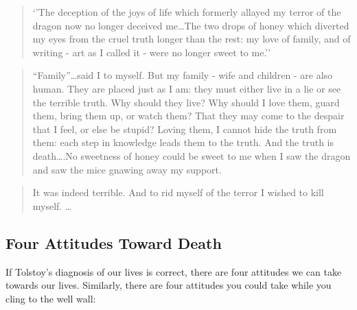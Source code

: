 \documentclass[]{article}
\begin{document}
\begin{quote}
`'The deception of the joys of life which formerly allayed my terror of
the dragon now no longer deceived me\ldots{}The two drops of honey which
diverted my eyes from the cruel truth longer than the rest: my love of
family, and of writing - art as I called it - were no longer sweet to
me.''
\end{quote}

\begin{quote}
``Family''\ldots{}said I to myself. But my family - wife and children -
are also human. They are placed just as I am: they must either live in a
lie or see the terrible truth. Why should they live? Why should I love
them, guard them, bring them up, or watch them? That they may come to
the despair that I feel, or else be stupid? Loving them, I cannot hide
the truth from them: each step in knowledge leads them to the truth. And
the truth is death\ldots{}.No sweetness of honey could be sweet to me
when I saw the dragon and saw the mice gnawing away my support.
\end{quote}

\begin{quote}
It was indeed terrible. And to rid myself of the terror I wished to kill
myself. \ldots{}
\end{quote}

\subsection{Four Attitudes Toward
Death}\label{four-attitudes-toward-death}

If Tolstoy's diagnosis of our lives is correct, there are four attitudes
we can take towards our lives. Similarly, there are four attitudes you
could take while you cling to the well wall:
\end{document}
